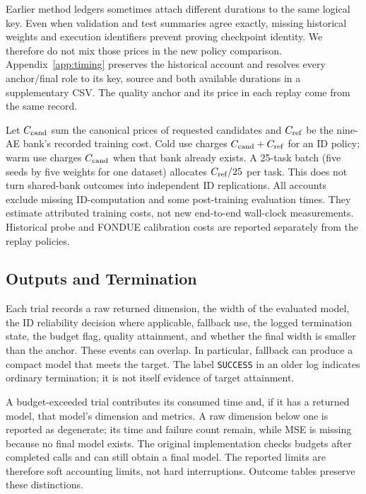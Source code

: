 \documentclass[make,article,submit,pdftex,moreauthors]{Definitions/mdpi}
\begin{document}
Earlier method ledgers sometimes attach different durations to the same
logical key. Even when validation and test summaries agree exactly,
missing historical weights and execution identifiers prevent proving
checkpoint identity. We therefore do not mix those prices in the new
policy comparison. Appendix~\ref{app:timing} preserves the historical
account and resolves every anchor/final role to its key, source and both
available durations in a supplementary CSV. The quality anchor and its
price in each replay come from the same record.

Let $C_{\rm cand}$ sum the canonical prices of requested candidates and
$C_{\rm ref}$ be the nine-AE bank's recorded training cost.
Cold use charges $C_{\rm cand}+C_{\rm ref}$ for an ID policy; warm use
charges $C_{\rm cand}$ when that bank already exists. A 25-task batch
(five seeds by five weights for one dataset) allocates $C_{\rm ref}/25$
per task. This does not turn shared-bank outcomes into independent ID
replications. All accounts exclude missing ID-computation and some
post-training evaluation times. They estimate attributed training costs,
not new end-to-end wall-clock measurements. Historical probe and FONDUE
calibration costs are reported separately from the replay policies.

\subsection{Outputs and Termination}\label{sec:outcomes}
Each trial records a raw returned dimension, the width of the evaluated
model, the ID reliability decision where applicable, fallback use, the
logged termination state, the budget flag, quality attainment, and whether
the final width is smaller than the anchor. These events can overlap.
In particular, fallback can produce a compact model that meets the target.
The label \texttt{SUCCESS} in an older log indicates ordinary termination;
it is not itself evidence of target attainment.

A budget-exceeded trial contributes its consumed time and, if it has a
returned model, that model's dimension and metrics. A raw dimension below
one is reported as degenerate; its time and failure count remain, while
MSE is missing because no final model exists. The original implementation
checks budgets after completed calls and can still obtain a final model.
The reported limits are therefore soft accounting limits, not hard
interruptions. Outcome tables preserve these distinctions.
\end{document}
